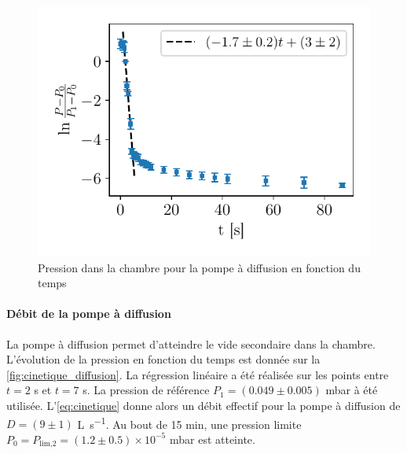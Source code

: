 \begin{minipage}{\textwidth}
    \begin{figure}
        \centering
        \includegraphics[width=\linewidth]{figures/cinetique_diffusion.pdf}
        \caption{Pression dans la chambre pour la pompe à diffusion en fonction du temps}
        \label{fig:cinetique_diffusion}
    \end{figure}
    
    \paragraph*{Débit de la pompe à diffusion}
    La pompe à diffusion permet d'atteindre le vide secondaire dans la chambre. L'évolution de la pression en fonction du temps est donnée sur la \autoref{fig:cinetique_diffusion}. La régression linéaire a été réalisée sur les points entre \(t = 2\) \si{\second} et \(t = 7\) \si{\second}. La pression de référence \(P_1 = (0.049 \pm 0.005)\) \si{\milli\bar} à été utilisée. L'\autoref{eq:cinetique} donne alors un débit effectif pour la pompe à diffusion de \(D = (9 \pm 1)\) \si{\liter \per \second}. Au bout de 15 \si{\minute}, une pression limite \(P_0 = P_\textrm{lim,2} = (1.2 \pm 0.5) \times 10^{-5}\) \si{\milli\bar} est atteinte.
\end{minipage}






